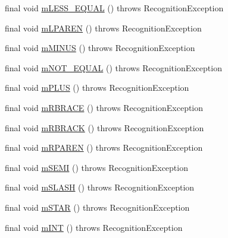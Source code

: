 \begin{DoxyCompactItemize}
\item 
final void \hyperlink{classorg_1_1tzi_1_1use_1_1parser_1_1testsuite_1_1_test_suite_lexer_aaa968ac7dec2a21185e2ba53113d596b}{m\-L\-E\-S\-S\-\_\-\-E\-Q\-U\-A\-L} ()  throws Recognition\-Exception 
\item 
final void \hyperlink{classorg_1_1tzi_1_1use_1_1parser_1_1testsuite_1_1_test_suite_lexer_acef4a1ab1ef8fe62720b3cdf0011c5c5}{m\-L\-P\-A\-R\-E\-N} ()  throws Recognition\-Exception 
\item 
final void \hyperlink{classorg_1_1tzi_1_1use_1_1parser_1_1testsuite_1_1_test_suite_lexer_a03cd1e3e07fdb4434c0db1510464456a}{m\-M\-I\-N\-U\-S} ()  throws Recognition\-Exception 
\item 
final void \hyperlink{classorg_1_1tzi_1_1use_1_1parser_1_1testsuite_1_1_test_suite_lexer_adf1f2a6690c85f7d5110b9f2f24d193e}{m\-N\-O\-T\-\_\-\-E\-Q\-U\-A\-L} ()  throws Recognition\-Exception 
\item 
final void \hyperlink{classorg_1_1tzi_1_1use_1_1parser_1_1testsuite_1_1_test_suite_lexer_af1284a7c0ee93a1777f28f2aaf5808b4}{m\-P\-L\-U\-S} ()  throws Recognition\-Exception 
\item 
final void \hyperlink{classorg_1_1tzi_1_1use_1_1parser_1_1testsuite_1_1_test_suite_lexer_a42c16cdc4b3fb5dbd859ee8125c6442f}{m\-R\-B\-R\-A\-C\-E} ()  throws Recognition\-Exception 
\item 
final void \hyperlink{classorg_1_1tzi_1_1use_1_1parser_1_1testsuite_1_1_test_suite_lexer_aa08fb336d6d9ab581660e6e00713de4c}{m\-R\-B\-R\-A\-C\-K} ()  throws Recognition\-Exception 
\item 
final void \hyperlink{classorg_1_1tzi_1_1use_1_1parser_1_1testsuite_1_1_test_suite_lexer_a92a03ca495dea979c92487a9c65e6e7e}{m\-R\-P\-A\-R\-E\-N} ()  throws Recognition\-Exception 
\item 
final void \hyperlink{classorg_1_1tzi_1_1use_1_1parser_1_1testsuite_1_1_test_suite_lexer_a83c7f5b21703260c90ad41c9ccff2c4b}{m\-S\-E\-M\-I} ()  throws Recognition\-Exception 
\item 
final void \hyperlink{classorg_1_1tzi_1_1use_1_1parser_1_1testsuite_1_1_test_suite_lexer_aba7039853092460069ffe9a77a6b87fe}{m\-S\-L\-A\-S\-H} ()  throws Recognition\-Exception 
\item 
final void \hyperlink{classorg_1_1tzi_1_1use_1_1parser_1_1testsuite_1_1_test_suite_lexer_a51b0adab13d05f4b7cac96116523df12}{m\-S\-T\-A\-R} ()  throws Recognition\-Exception 
\item 
final void \hyperlink{classorg_1_1tzi_1_1use_1_1parser_1_1testsuite_1_1_test_suite_lexer_a854808edfee1684b4142a15458f03c75}{m\-I\-N\-T} ()  throws Recognition\-Exception 

\end{DoxyCompactItemize}
